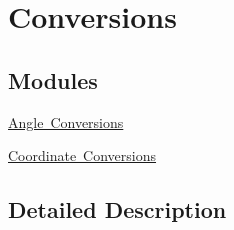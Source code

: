 \hypertarget{group___e_g_x_math-_conversions}{}\section{Conversions}
\label{group___e_g_x_math-_conversions}
\subsection*{Modules}
\begin{DoxyCompactItemize}
\item 
\mbox{\hyperlink{group___e_g_x_math-_conversions-_angle_conversions}{Angle Conversions}}
\item 
\mbox{\hyperlink{group___e_g_x_math-_conversions-_coordinate_conversions}{Coordinate Conversions}}
\end{DoxyCompactItemize}


\subsection{Detailed Description}

